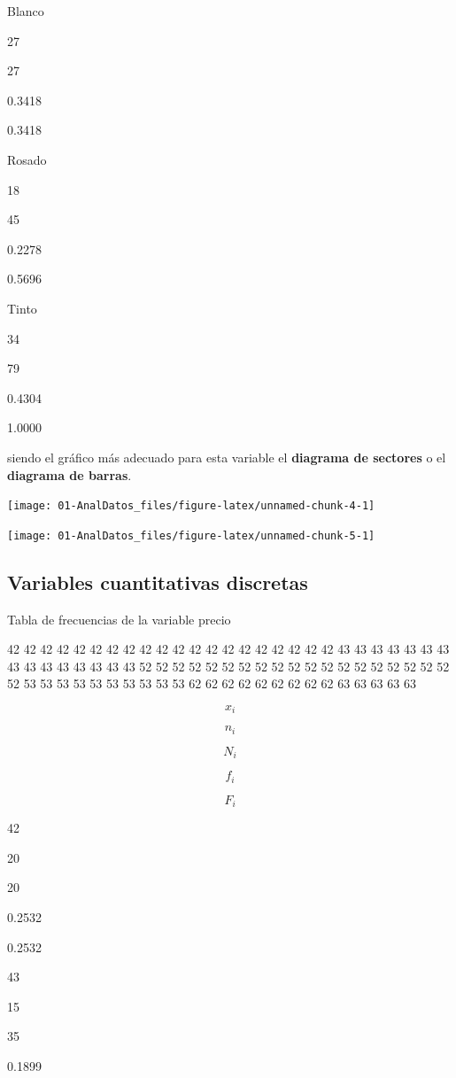 \documentclass[]{book}
\theoremstyle{definition}
\theoremstyle{definition}
\theoremstyle{definition}
\theoremstyle{remark}
\begin{document}
Blanco

27

27

0.3418

0.3418

Rosado

18

45

0.2278

0.5696

Tinto

34

79

0.4304

1.0000

siendo el gráfico más adecuado para esta variable el \textbf{diagrama de
sectores} o el \textbf{diagrama de barras}.

\begin{center}\texttt{[image: 01-AnalDatos\_files/figure-latex/unnamed-chunk-4-1]} \end{center}

\begin{center}\texttt{[image: 01-AnalDatos\_files/figure-latex/unnamed-chunk-5-1]} \end{center}

\subsection{Variables cuantitativas
discretas}\label{variables-cuantitativas-discretas}

Tabla de frecuencias de la variable precio

42 42 42 42 42 42 42 42 42 42 42 42 42 42 42 42 42 42 42 42 43 43 43 43
43 43 43 43 43 43 43 43 43 43 43 52 52 52 52 52 52 52 52 52 52 52 52 52
52 52 52 52 52 52 52 53 53 53 53 53 53 53 53 53 53 62 62 62 62 62 62 62
62 62 63 63 63 63 63

\[ x_i \]

\[ n_i \]

\[ N_i \]

\[ f_i \]

\[ F_i \]

42

20

20

0.2532

0.2532

43

15

35

0.1899
\end{document}
